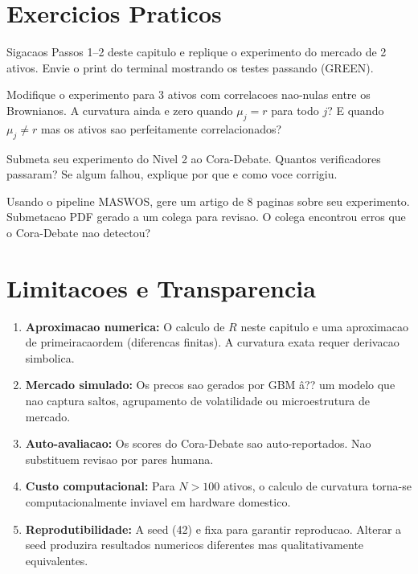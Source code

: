 \section{Exercicios Praticos}

\begin{exer}
Sigacaos Passos 1--2 deste capitulo e replique o experimento do mercado
de 2 ativos. Envie o print do terminal mostrando os testes passando (GREEN).
\end{exer}

\begin{exer}
Modifique o experimento para 3 ativos com correlacoes nao-nulas entre
os Brownianos. A curvatura ainda e zero quando $\mu_j = r$ para todo $j$?
E quando $\mu_j \neq r$ mas os ativos sao perfeitamente correlacionados?
\end{exer}

\begin{exer}
Submeta seu experimento do Nivel 2 ao Cora-Debate. Quantos verificadores
passaram? Se algum falhou, explique por que e como voce corrigiu.
\end{exer}

\begin{exer}
Usando o pipeline MASWOS, gere um artigo de 8 paginas sobre seu
experimento. Submetacao PDF gerado a um colega para revisao.
O colega encontrou erros que o Cora-Debate nao detectou?
\end{exer}

\section{Limitacoes e Transparencia}

\begin{enumerate}[nosep]
 \item \textbf{Aproximacao numerica:} O calculo de $R$ neste capitulo e
 uma aproximacao de primeiracaordem (diferencas finitas). A curvatura
 exata requer derivacao simbolica.
 \item \textbf{Mercado simulado:} Os precos sao gerados por GBM \^a?? um modelo
 que nao captura saltos, agrupamento de volatilidade ou
 microestrutura de mercado.
 \item \textbf{Auto-avaliacao:} Os scores do Cora-Debate sao auto-reportados.
 Nao substituem revisao por pares humana.
 \item \textbf{Custo computacional:} Para $N > 100$ ativos, o calculo de
 curvatura torna-se computacionalmente inviavel em hardware domestico.
 \item \textbf{Reprodutibilidade:} A seed (42) e fixa para garantir
 reproducao. Alterar a seed produzira resultados numericos diferentes
 mas qualitativamente equivalentes.
\end{enumerate}
